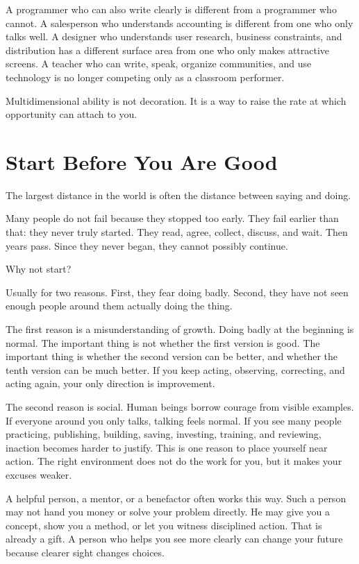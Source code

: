 A programmer who can also write clearly is different from a programmer who cannot. A salesperson who understands accounting is different from one who only talks well. A designer who understands user research, business constraints, and distribution has a different surface area from one who only makes attractive screens. A teacher who can write, speak, organize communities, and use technology is no longer competing only as a classroom performer.

Multidimensional ability is not decoration. It is a way to raise the rate at which opportunity can attach to you.

\section*{Start Before You Are Good}

The largest distance in the world is often the distance between saying and doing.

Many people do not fail because they stopped too early. They fail earlier than that: they never truly started. They read, agree, collect, discuss, and wait. Then years pass. Since they never began, they cannot possibly continue.

Why not start?

Usually for two reasons. First, they fear doing badly. Second, they have not seen enough people around them actually doing the thing.

The first reason is a misunderstanding of growth. Doing badly at the beginning is normal. The important thing is not whether the first version is good. The important thing is whether the second version can be better, and whether the tenth version can be much better. If you keep acting, observing, correcting, and acting again, your only direction is improvement.

The second reason is social. Human beings borrow courage from visible examples. If everyone around you only talks, talking feels normal. If you see many people practicing, publishing, building, saving, investing, training, and reviewing, inaction becomes harder to justify. This is one reason to place yourself near action. The right environment does not do the work for you, but it makes your excuses weaker.

A helpful person, a mentor, or a benefactor often works this way. Such a person may not hand you money or solve your problem directly. He may give you a concept, show you a method, or let you witness disciplined action. That is already a gift. A person who helps you see more clearly can change your future because clearer sight changes choices.

